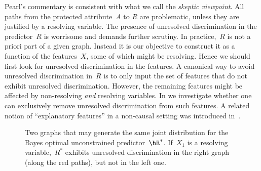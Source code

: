 Pearl's commentary is consistent with what we call the \emph{skeptic viewpoint}. All paths from
the protected attribute~$A$ to $R$ are problematic, unless they are justified by
a resolving variable. The presence of unresolved discrimination in the
predictor~$R$ is worrisome and demands further scrutiny. In practice,~$R$ is not
a priori part of a given graph. Instead it is our objective to construct it as a
function of the features~$X$, some of which might be resolving. Hence we should
first look for unresolved discrimination in the features. A canonical way to
avoid unresolved discrimination in~$R$ is to only input the set of features that
do not exhibit unresolved discrimination. However, the remaining features might
be affected by non-resolving \emph{and} resolving variables. In
 we investigate whether one can exclusively remove
unresolved discrimination from such features. A related notion of ``explanatory
features'' in a non-causal setting was introduced in~\cite{Kamiran2013}.

\begin{figure}
  \centering
{}%
  \hspace{0.5cm}
%
  \caption{Two graphs that may generate the same joint distribution for the
  Bayes optimal unconstrained predictor~$\hR^*$. If~$X_1$ is a resolving
  variable,~$R^*$ exhibits unresolved discrimination in the right graph (along
  the red paths), but not in the left one.}
  \label{fig:unidentifiability}
\end{figure}

